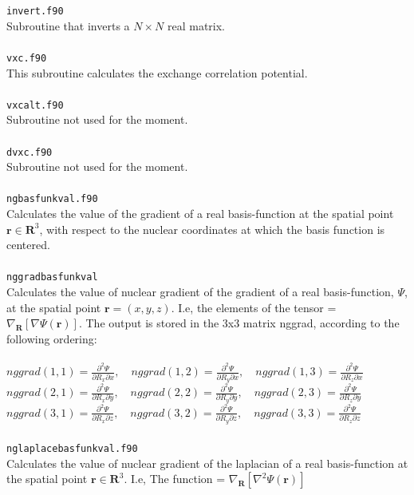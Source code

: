 \documentclass[a4paper,twoside,openany]{book}
\begin{document}
{{\texttt{invert.f90}\\
Subroutine that inverts a $N\times N$ real matrix.\\ \\
\texttt{vxc.f90}\\
This subroutine calculates the exchange correlation potential. \\ \\
\texttt{vxcalt.f90} \\
Subroutine not used for the moment. \\ \\
\texttt{dvxc.f90}\\
Subroutine not used for the moment. \\ \\
\texttt{ngbasfunkval.f90} \\
Calculates the value of the gradient of a real basis-function at the spatial
point $\mathbf{r}\in\mathbf{R}^{3}$, with respect to the nuclear coordinates at which the basis
function is centered. \\ \\
\texttt{nggradbasfunkval}\\
Calculates the value of nuclear gradient of the gradient of a real basis-function, $\Psi$, at the spatial
point $\mathbf{r}=(x,y,z)$. I.e, the elements of the tensor = $\nabla_{\mathbf{R}}[\nabla\Psi(\mathbf{r})]$.
The output is stored in the 3x3 matrix nggrad, according to the
following ordering:\\ \\
$nggrad(1,1) = \frac{\partial^2\Psi}{\partial R_{x}\partial x},\quad nggrad(1,2) = \frac{\partial^2\Psi}{\partial R_{y}\partial x},\quad nggrad(1,3) = \frac{\partial^2\Psi}{\partial R_{z}\partial x}$ \\
$nggrad(2,1) = \frac{\partial ^2\Psi}{\partial R_{x}\partial y},\quad nggrad(2,2) = \frac{\partial^2\Psi}{\partial R_{y}\partial y},\quad nggrad(2,3) = \frac{\partial^2\Psi}{\partial R_{z}\partial y}$ \\
$nggrad(3,1) = \frac{\partial ^2\Psi}{\partial R_{x}\partial z},\quad nggrad(3,2) = \frac{\partial^2\Psi}{\partial R_{y}\partial z},\quad nggrad(3,3) = \frac{\partial^2\Psi}{\partial R_{z}\partial z}$ \\ \\
\texttt{nglaplacebasfunkval.f90}\\
Calculates the value of nuclear gradient of the laplacian of a real basis-function at the spatial
point $\mathbf{r}\in\mathbf{R}^{3}$. I.e, The function = $\nabla_{\mathbf{R}}[\nabla^{2}\Psi(\mathbf{r})]$
}}
\end{document}
